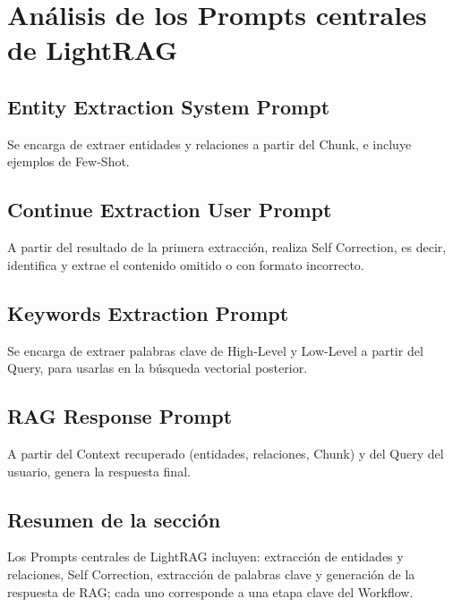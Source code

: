 \section{Análisis de los Prompts centrales de LightRAG}

\subsection{Entity Extraction System Prompt}

Se encarga de extraer entidades y relaciones a partir del Chunk, e incluye ejemplos de Few-Shot.

\subsection{Continue Extraction User Prompt}

A partir del resultado de la primera extracción, realiza Self Correction, es decir, identifica y extrae el contenido omitido o con formato incorrecto.

\subsection{Keywords Extraction Prompt}

Se encarga de extraer palabras clave de High-Level y Low-Level a partir del Query, para usarlas en la búsqueda vectorial posterior.

\subsection{RAG Response Prompt}

A partir del Context recuperado (entidades, relaciones, Chunk) y del Query del usuario, genera la respuesta final.

\subsection{Resumen de la sección}

Los Prompts centrales de LightRAG incluyen: extracción de entidades y relaciones, Self Correction, extracción de palabras clave y generación de la respuesta de RAG; cada uno corresponde a una etapa clave del Workflow.

